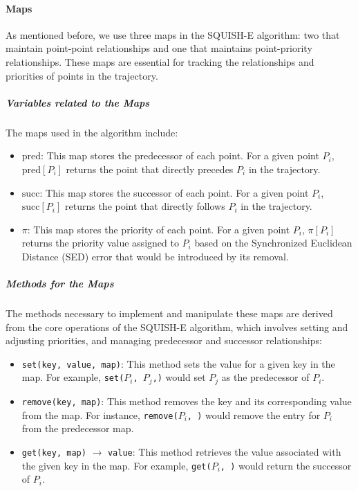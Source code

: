 \paragraph{Maps}

As mentioned before, we use three maps in the SQUISH-E algorithm: two that maintain point-point relationships and one that maintains point-priority relationships. These maps are essential for tracking the relationships and priorities of points in the trajectory.

\subparagraph{Variables related to the Maps}
The maps used in the algorithm include:

\begin{itemize}
    \item \texttt{$\text{pred}$}: This map stores the predecessor of each point. For a given point $P_i$, 
    $\text{pred}[P_i]$ returns the point that directly precedes $P_i$ in the trajectory.
    \item \texttt{$\text{succ}$}: This map stores the successor of each point. For a given point $P_i$, 
    $\text{succ}[P_i]$ returns the point that directly follows $P_i$ in the trajectory.
    \item \texttt{$\pi$}: This map stores the priority of each point. For a given point $P_i$, $\pi[P_i]$ returns the priority value assigned to $P_i$ based on the Synchronized Euclidean Distance (SED) error that would be introduced by its removal.
\end{itemize}

\subparagraph{Methods for the Maps}
The methods necessary to implement and manipulate these maps are derived from the core operations of the SQUISH-E algorithm, which involves setting and adjusting priorities, and managing predecessor and successor relationships:

\begin{itemize}
    \item \texttt{set(key, value, map)}: This method sets the value for a given key in the map. For example,
    \texttt{set($P_i$, $P_j$,)} would set $P_j$ as the predecessor of $P_i$.
    
    \item \texttt{remove(key, map)}: This method removes the key and its corresponding value from the map. For instance, \texttt{remove($P_i$, )} would remove the entry for $P_i$ from the predecessor map.
    \item \texttt{get(key, map)} $\rightarrow$ \texttt{value}: This method retrieves the value associated with the given key in the map. For example, \texttt{get($P_i$, )} would return the successor of $P_i$.
\end{itemize}

